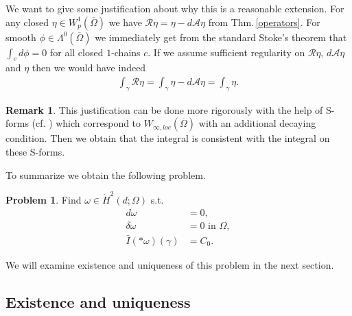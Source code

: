 \documentclass[12pt,a4paper]{article}
\theoremstyle{definition}
\newtheorem{remark}{Remark}
\newtheorem{problem}{Problem}
\newcommand{\aop}{\mathscr{A}}
\newcommand{\omegabar}{\overline{\Omega}}
\newcommand{\rop}{\mathscr{R}} %
\begin{document}
We want to give some justification about why this is a reasonable extension.
For any closed $\eta \in W^1_p(\omegabar)$ we have $\rop \eta = \eta - 
d\aop\eta$ from Thm.\,\ref{operators}. For smooth 
$\phi \in \Lambda^0(\omegabar)$ we immediately get from the standard Stoke's 
theorem that $\int_c d\phi = 0$ for all closed $1$-chains $c$. If we 
assume sufficient regularity on $\rop \eta$, $d\aop\eta$ and $\eta$ 
then we would have indeed 
\begin{align*}
    \int_\gamma \rop \eta = \int_\gamma \eta - d\aop\eta = \int_\gamma \eta.
\end{align*}

\begin{remark}
    This justification can be done more rigorously with the help of S-forms
    (cf. \cite{goldshtein}) which correspond to $W_{\infty,loc}(\omegabar)$
    with an additional decaying condition. Then we obtain that the integral 
    is consistent with the integral on these S-forms.
\end{remark}
\noindent To summarize we obtain the following problem.

\begin{problem}
    Find $\omega \in \mathring{H}^2(d;\Omega)$ s.t.
    \begin{align*}
        d \omega &= 0, \\
        \delta \omega &= 0 \text{ in $\Omega$}, \\
        \bar{I}(*\omega)(\gamma)  &= C_0.
    \end{align*}
\end{problem}
\noindent We will examine existence and 
uniqueness of this problem in the next section.


\subsection{Existence and uniqueness}
\end{document}
